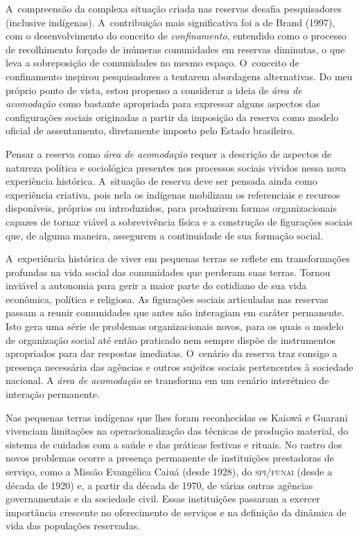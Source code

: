 A~compreensão da complexa situação criada nas reservas desafia
pesquisadores (inclusive indígenas). A~contribuição mais significativa
foi a de Brand (1997), com o desenvolvimento do conceito de \emph{confinamento},
entendido como o processo de recolhimento forçado de inúmeras
comunidades em reservas diminutas, o que leva a sobreposição de
comunidades no mesmo espaço. O~conceito de confinamento inspirou
pesquisadores a tentarem abordagens alternativas. Do meu próprio ponto
de vista, estou propenso a considerar a ideia de \emph{área de acomodação}
como bastante apropriada para expressar alguns aspectos das
configurações sociais originadas a partir da imposição da reserva como
modelo oficial de assentamento, diretamente imposto pelo Estado
brasileiro. 

Pensar a reserva como \emph{área de acomodação} requer a descrição de aspectos
de natureza política e sociológica presentes nos processos sociais
vividos nessa nova experiência histórica. A~situação de reserva deve
ser pensada ainda como experiência criativa, pois nela os indígenas
mobilizam os referenciais e recursos disponíveis, próprios ou
introduzidos, para produzirem formas organizacionais capazes de tornar
viável a sobrevivência física e a construção de figurações sociais que,
de alguma maneira, assegurem a continuidade de sua formação social. 

A~experiência histórica de viver em pequenas terras se reflete em
transformações profundas na vida social das comunidades que perderam
suas terras. Tornou inviável a autonomia para gerir a maior parte do
cotidiano de sua vida econômica, política e religiosa. As figurações
sociais articuladas nas reservas passam a reunir comunidades que antes
não interagiam em caráter permanente. Isto gera uma série de problemas
organizacionais novos, para os quais o modelo de organização social até
então praticado nem sempre dispõe de instrumentos apropriados para dar
respostas imediatas. O~cenário da reserva traz consigo a presença necessária das
agências e outros sujeitos sociais pertencentes à sociedade nacional. A
\emph{área de acomodação} se transforma em um cenário interétnico de interação
permanente.

Nas pequenas terras indígenas que lhes foram reconhecidas os Kaiowá e
Guarani vivenciam limitações na operacionalização das técnicas de
produção material, do sistema de cuidados com a saúde e das práticas
festivas e rituais. No rastro dos novos problemas ocorre a presença
permanente de instituições prestadoras de serviço, como a Missão
Evangélica Caiuá (desde 1928), do \textsc{spi}/\textsc{funai} (desde a década de 1920) e,
a partir da década de 1970, de várias outras agências governamentais e
da sociedade civil. Essas instituições passaram a exercer importância
crescente no oferecimento de serviços e na definição da dinâmica de
vida das populações reservadas.

